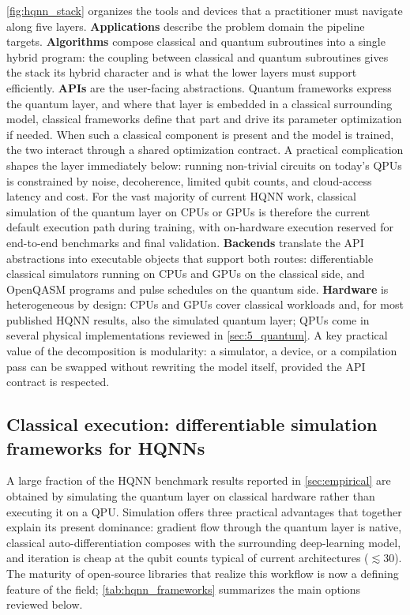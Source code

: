 \documentclass[aps,10pt,groupedaddress,prx,superscriptaddress,twocolumn,balancelastpage, tightenlines]{revtex4-2}
\theoremstyle{plain}  %
\begin{document}
\autoref{fig:hqnn_stack} organizes the tools and devices that a practitioner must navigate along five layers. \textbf{Applications} describe the problem domain the pipeline targets. \textbf{Algorithms} compose classical and quantum subroutines into a single hybrid program: the coupling between classical and quantum subroutines gives the stack its hybrid character and is what the lower layers must support efficiently. \textbf{APIs} are the user-facing abstractions. Quantum frameworks express the quantum layer, and where that layer is embedded in a classical surrounding model, classical frameworks define that part and drive its parameter optimization if needed. When such a classical component is present and the model is trained, the two interact through a shared optimization contract. A practical complication shapes the layer immediately below: running non-trivial circuits on today's \glspl{QPU} is constrained by noise, decoherence, limited qubit counts, and cloud-access latency and cost. For the vast majority of current \gls{HQNN} work, classical simulation of the quantum layer on CPUs or GPUs is therefore the current default execution path during training, with on-hardware execution reserved for end-to-end benchmarks and final validation. \textbf{Backends} translate the API abstractions into executable objects that support both routes: differentiable classical simulators running on CPUs and GPUs on the classical side, and OpenQASM programs and pulse schedules on the quantum side. \textbf{Hardware} is heterogeneous by design: CPUs and GPUs cover classical workloads and, for most published \gls{HQNN} results, also the simulated quantum layer; \glspl{QPU} come in several physical implementations reviewed in \autoref{sec:5_quantum}. A key practical value of the decomposition is modularity: a simulator, a device, or a compilation pass can be swapped without rewriting the model itself, provided the API contract is respected.

\subsection{Classical execution: differentiable simulation frameworks for HQNNs}
\label{sec:5_classical}


A large fraction of the \gls{HQNN} benchmark results reported in \autoref{sec:empirical} are obtained by simulating the quantum layer on classical hardware rather than executing it on a \gls{QPU}. Simulation offers three practical advantages that together explain its present dominance: gradient flow through the quantum layer is native, classical auto-differentiation composes with the surrounding deep-learning model, and iteration is cheap at the qubit counts typical of current architectures ($\lesssim 30$). The maturity of open-source libraries that realize this workflow is now a defining feature of the field; \autoref{tab:hqnn_frameworks} summarizes the main options reviewed below.
\end{document}
